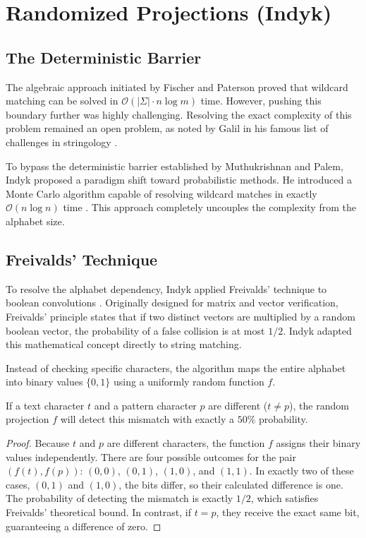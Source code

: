 \chapter{Randomized Projections (Indyk)}

\section{The Deterministic Barrier}
The algebraic approach initiated by Fischer and Paterson proved that wildcard matching can be solved in $\mathcal{O}(|\Sigma| \cdot n \log m)$ time. However, pushing this boundary further was highly challenging. Resolving the exact complexity of this problem remained an open problem, as noted by Galil in his famous list of challenges in stringology \cite{galil1985open}.

To bypass the deterministic barrier established by Muthukrishnan and Palem, Indyk proposed a paradigm shift toward probabilistic methods. He introduced a Monte Carlo algorithm capable of resolving wildcard matches in exactly $\mathcal{O}(n \log n)$ time \cite{indyk1998}. This approach completely uncouples the complexity from the alphabet size.

\section{Freivalds' Technique}
To resolve the alphabet dependency, Indyk applied Freivalds' technique \cite{freivalds1977probabilistic} to boolean convolutions \cite{indyk1998}. Originally designed for matrix and vector verification, Freivalds' principle states that if two distinct vectors are multiplied by a random boolean vector, the probability of a false collision is at most $1/2$. Indyk adapted this mathematical concept directly to string matching.

Instead of checking specific characters, the algorithm maps the entire alphabet into binary values $\{0, 1\}$ using a uniformly random function $f$.

\begin{lemma}
If a text character $t$ and a pattern character $p$ are different ($t \neq p$), the random projection $f$ will detect this mismatch with exactly a $50\%$ probability.
\end{lemma}

\begin{proof}
Because $t$ and $p$ are different characters, the function $f$ assigns their binary values independently. There are four possible outcomes for the pair $(f(t), f(p))$: $(0,0)$, $(0,1)$, $(1,0)$, and $(1,1)$. In exactly two of these cases, $(0,1)$ and $(1,0)$, the bits differ, so their calculated difference is one. The probability of detecting the mismatch is exactly $1/2$, which satisfies Freivalds' theoretical bound. In contrast, if $t = p$, they receive the exact same bit, guaranteeing a difference of zero.
\end{proof}

